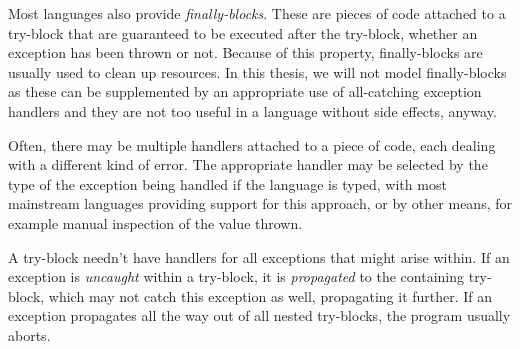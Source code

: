 Most languages also provide \emph{finally-blocks}. These are pieces of code attached to a
try-block that are guaranteed to be executed after the try-block, whether an exception
has been thrown or not. Because of this property, finally-blocks are usually used to clean up
resources. In this thesis, we will not model finally-blocks as these can be
supplemented by an appropriate use of all-catching exception handlers and they are not
too useful in a language without side effects, anyway.

Often, there may be multiple handlers attached to a piece of code, each dealing with a different
kind of error. The appropriate handler
may be selected by the type of the exception being handled if the language is typed, with
most mainstream languages providing support for this approach, or by other means, for example
manual inspection of the value thrown.

A try-block needn't have handlers for all exceptions that might arise within. If an exception
is \emph{uncaught} within a try-block, it is \emph{propagated} to the containing try-block,
which may not catch this exception as well, propagating it further.
If an exception propagates all the way out of all nested try-blocks, the program usually
aborts.


